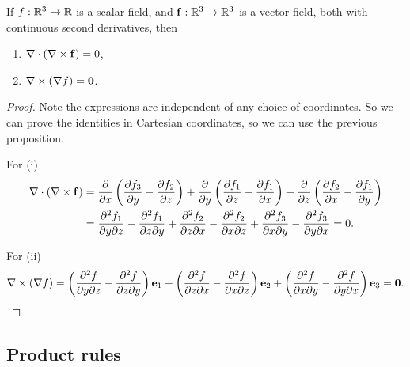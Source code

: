 \documentclass[10pt, a4paper]{article}
\begin{document}
\begin{corollary}
    If $f : \R ^ 3 \to \R$ is a scalar field,
    and $\mbf{f} : \R ^ 3 \to \R ^ 3$ is a vector field,
    both with continuous second derivatives,
    then
    \begin{enumerate}[label = (\roman*)]
        \item $\mbf{\nabla} \cdot (\mbf{\nabla} \times \mbf{f}) = 0$,
        
        \item $\mbf{\nabla} \times (\mbf{\nabla}f) = \mbf{0}$.
    \end{enumerate}

    \begin{proof}
        Note the expressions are independent of any choice of coordinates.
        So we can prove the identities in Cartesian coordinates,
        so we can use the previous proposition.

        For
        (i)
        \begin{align*}
            \mbf{\nabla} \cdot (\mbf{\nabla} \times \mbf{f}) &= \pd{x}\left(\pd[f_3]{y} - \pd[f_2]{z}\right) + \pd{y}\left(\pd[f_1]{z} - \pd[f_1]{x}\right) + \pd{z}\left(\pd[f_2]{x} - \pd[f_1]{y}\right) \\
            &= \frac{\partial ^ 2f_1}{\partial y\partial z} - \frac{\partial ^ 2f_1}{\partial z\partial y} + \frac{\partial ^ 2f_2}{\partial z\partial x} - \frac{\partial ^ 2f_2}{\partial x\partial z} + \frac{\partial ^ 2f_3}{\partial x\partial y} - \frac{\partial ^ 2f_3}{\partial y\partial x} = 0.
        \end{align*}

        For
        (ii)
        \[
        \mbf{\nabla} \times (\mbf{\nabla}f) = \left(\frac{\partial ^ 2 f}{\partial y \partial z} - \frac{\partial ^ 2 f}{\partial z \partial y}\right)\mbf{e}_1 + \left(\frac{\partial ^ 2 f}{\partial z \partial x} - \frac{\partial ^ 2 f}{\partial x \partial z}\right)\mbf{e}_2 + \left(\frac{\partial ^ 2 f}{\partial x \partial y} - \frac{\partial ^ 2 f}{\partial y \partial x}\right)\mbf{e}_3 = \mbf{0}.
        \]
    \end{proof}
\end{corollary}


\subsection{Product rules}
\end{document}
